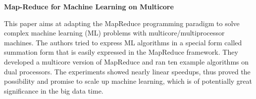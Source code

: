 \documentclass[a4paper]{article}
\begin{document}
\pagestyle{fancy}                                                       %
\lfoot{}                                                      %
\cfoot{}                                                                %
\renewcommand\headrulewidth{0.4pt}                                      %

\renewcommand{\title}[1]{\begin{center}
\Large\textbf{#1}
\end{center}}

\title{Map-Reduce for Machine Learning on Multicore}

This paper aims at adapting the MapReduce programming paradigm to solve complex machine learning
(ML) problems with multicore/multiprocessor machines. The authors tried to express ML algorithms in a
special form called summation form that is easily expressed in the MapReduce framework. They developed
a multicore version of MapReduce and ran ten example algorithms on dual processors. The experiments
showed nearly linear speedups, thus proved the possibility and promise to scale up machine learning, which
is of potentially great significance in the big data time.
\end{document}
